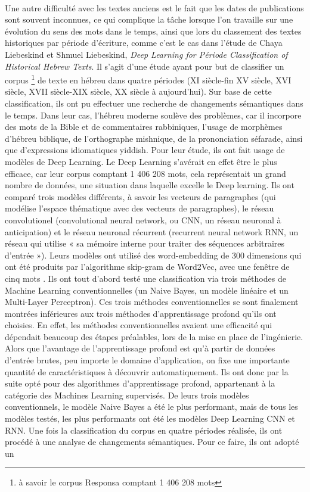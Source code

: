 \documentclass{article}
\begin{document}
\paragraph{}
Une autre difficulté avec les textes anciens est le fait que les dates de publications sont souvent inconnues, ce qui complique la tâche lorsque l’on travaille sur une évolution du sens des mots dans le temps, ainsi que lors du classement des textes historiques par période d’écriture, comme c’est le cas dans l’étude de Chaya Liebeskind et Shmuel Liebeskind, \textit{Deep Learning for Période Classification of Historical Hebrew Texts}. Il s’agit d’une étude ayant pour but de classifier un corpus \footnote{à savoir le corpus Responsa comptant 1 406 208 mots} de texte en hébreu dans quatre périodes (XI siècle-fin XV siècle, XVI siècle, XVII siècle-XIX siècle, XX siècle à aujourd’hui). Sur base de cette classification, ils ont pu effectuer une recherche de changements sémantiques dans le temps. Dans leur cas, l’hébreu moderne soulève des problèmes, car il incorpore des mots de la Bible et de commentaires rabbiniques, l’usage de morphèmes d’hébreu biblique, de l’orthographe mishnique, de la prononciation séfarade, ainsi que d’expressions idiomatiques yiddish. Pour leur étude, ils ont fait usage de modèles de Deep Learning. Le Deep Learning s’avérait en effet être le plus efficace, car leur corpus comptant 1 406 208 mots, cela représentait un grand nombre de données, une situation dans laquelle excelle le Deep learning. Ils ont comparé trois modèles différents, à savoir les vecteurs de paragraphes (qui modélise l’espace thématique avec des vecteurs de paragraphes), le réseau convolutionel (convolutional neural network, ou CNN, un réseau neuronal à anticipation) et le réseau neuronal récurrent (recurrent neural network RNN, un réseau qui utilise « sa mémoire interne pour traiter des séquences arbitraires d’entrée »\cite{liebeskind2020deep}). Leurs modèles ont utilisé des word-embedding de 300 dimensions qui ont été produits par l’algorithme skip-gram de Word2Vec, avec une fenêtre de cinq mots . Ils ont tout d’abord testé une classification via trois méthodes de Machine Learning conventionnelles (un Naive Bayes, un modèle linéaire et un Multi-Layer Perceptron). Ces trois méthodes conventionnelles se sont finalement montrées inférieures aux trois méthodes d’apprentissage profond qu’ils ont choisies. En effet, les méthodes conventionnelles avaient une efficacité qui dépendait beaucoup des étapes préalables, lors de la mise en place de l’ingénierie. Alors que l’avantage de l’apprentissage profond est qu’à partir de données d’entrée brutes, peu importe le domaine d’application, on fixe une importante quantité de caractéristiques à découvrir automatiquement. Ils ont donc par la suite opté pour des algorithmes d’apprentissage profond, appartenant à la catégorie des Machines Learning supervisés. De leurs trois modèles conventionnels, le modèle Naive Bayes a été le plus performant, mais de tous les modèles testés, les plus performants ont été les modèles Deep Learning CNN et RNN. Une fois la classification du corpus en quatre périodes réalisée, ils ont procédé à une analyse de changements sémantiques. Pour ce faire, ils ont adopté un 
\end{document}

